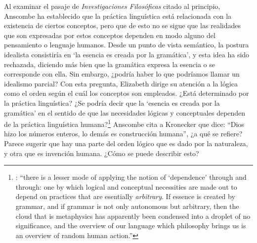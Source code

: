 Al examinar el pasaje de \emph{Investigaciones Filosóficas} citado al principio, Anscombe ha establecido que la práctica linguística está relacionada con la existencia de ciertos conceptos, pero que de esto no se sigue que las realidades que son expresadas por estos conceptos dependen en modo alguno del pensamiento o lenguaje humanos. Desde un punto de vista semántico, la postura idealista consistiría en \enquote*{la esencia es creada por la gramática}, y esta idea ha sido rechazada, diciendo más bien que la gramática expresa la esencia o se corresponde con ella. Sin embargo, ¿podría haber lo que podríamos llamar un idealismo parcial? Con esta pregunta, Elizabeth dirige su atención a la lógica como el orden según el cuál los conceptos son empleados. ¿Está determinado por la práctica linguística? ¿Se podría decir que la \enquote*{esencia es creada por la gramática} en el sentido de que las necesidades lógicas y conceptuales dependen de la práctica linguística humana?\footnote{\cite[Cf.~][220]{teichmann2008ans}: \enquote{there is a lesser mode of applying the notion of `dependence' through and through: one by which logical and conceptual necessities are made out to depend on practices that are esentially \emph{arbitrary}. If essence is created by grammar, and if grammar is not only autonomous but arbitrary, then the cloud that is metaphysics has apparently been condensed into a droplet of no significance, and the overview of our language which philosophy brings us is an overview of random human action.}} Anscombe cita a Kronecker que dice: \enquote{Dios hizo los números enteros, lo demás es construcción humana}, ¿a qué se refiere? Parece sugerir que hay una parte del orden lógico que es dado por la naturaleza, y otra que es invención humana. ¿Cómo se puede describir esto?

